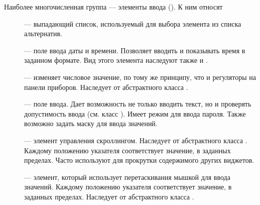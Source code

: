 Наиболее многочисленная группа --- элементы ввода (). 
К ним относят 
\begin{description}
\item[] ---
выпадающий список, используемый для выбора элемента из списка
альтернатив. 
\item[] --- поле  ввода даты и времени.
Позволяет вводить и показывать время в заданном формате. Вид этого элемента наследуют также  и .
\item[] --- изменяет числовое значение, по тому же
принципу, что и регуляторы на панели приборов. Наследует от абстрактного класса .
\item[] --- поле ввода. Дает возможность не только вводить текст, но и
проверять допустимость ввода (см. класс ). Имеет режим для ввода пароля. Также возможно задать маску для
ввода значений.
\item[] --- элемент управления скроллингом.
Наследует от абстрактного класса . Каждому положению указателя соответствует значение, в заданных
пределах. Часто используют для прокрутки содержимого других виджетов.
\item[] --- элемент, который использует
перетаскивания мышкой для ввода значений. Каждому положению указателя соответствует значение, в заданных пределах.
Наследует от абстрактного класса . 
\end{description}

